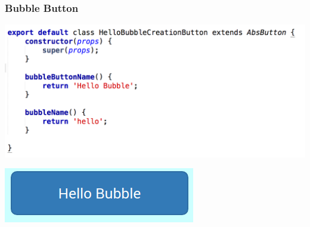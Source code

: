 \begin{frame}
  \frametitle{Bubble Button}
  \begin{center}
  \begin{minipage}{.70\textwidth}
    \includegraphics[width=\textwidth]{code/hellobubblecreationbutton.png}
  \end{minipage}
  \begin{minipage}{.28\textwidth}
    \includegraphics[width=\textwidth]{code/button.png}
  \end{minipage}
  \end{center}
\end{frame}

